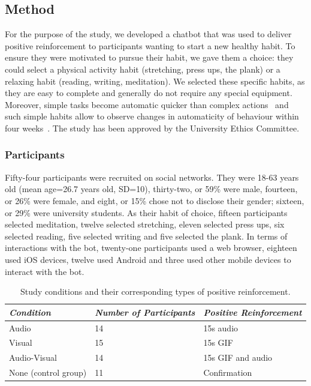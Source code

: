 \documentclass{scaffold/sigchi}
\begin{document}
\subsection{Method}
For the purpose of the study, we developed a chatbot that was used to deliver positive reinforcement to participants wanting to start a new healthy habit. To ensure they were motivated to pursue their habit, we gave them a choice: they could select a physical activity habit (stretching, press ups, the plank) or a relaxing habit (reading, writing, meditation). We selected these specific habits, as they are easy to complete and generally do not require any special equipment. Moreover, simple tasks become automatic quicker than complex actions~\cite{article_how_habits_formed_modelling_habit_formation} and such simple habits allow to observe changes in automaticity of behaviour within four weeks~\cite{article_beyond_self_tracking_designing_apps}. 
The study has been approved by the University Ethics Committee.

\subsubsection{Participants}
Fifty-four participants were recruited on social networks. They were 18-63 years old (mean age=26.7 years old, SD=10), thirty-two, or 59\% were male, fourteen, or 26\% were female, and eight, or 15\%  chose not to disclose their gender; sixteen, or 29\% were university students. As their habit of choice, fifteen participants selected meditation, twelve selected stretching, eleven selected press ups, six selected reading, five selected writing and five selected the plank. In terms of interactions with the bot, twenty-one participants used a web browser, eighteen used iOS devices, twelve used Android and three used other mobile devices to interact with the bot. 

\begin{table}
  \centering   
  \begin{tabular}{l l l}
\multicolumn{1}{l}{\small \textit{Condition}} &
\multicolumn{1}{p{1.4cm}}{\small \textit{Number of Participants}} &
\multicolumn{1}{l}{\small \textit{Positive Reinforcement}} \\
    \midrule
    Audio & 14 & 15s audio\\
    Visual & 15 & 15s GIF \\
    Audio-Visual & 14 & 15s GIF and audio \\
    None (control group) & 11 & Confirmation \\
  \end{tabular}
  \caption{Study conditions and their corresponding types of positive reinforcement.}~\label{table:precise_rewards}
\end{table}
\end{document}
